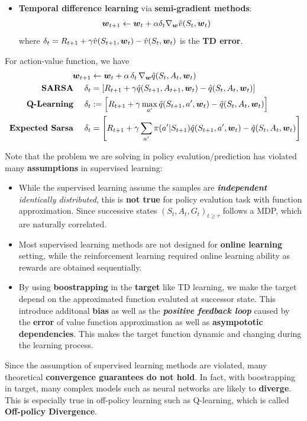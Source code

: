 \documentclass[11pt]{article}
\begin{document}
\begin{itemize}
\begin{itemize}
\item \textbf{Temporal difference learning} via \textbf{semi-gradient methods}:
\begin{align}
\boldsymbol{w}_{t+1} &\leftarrow  \boldsymbol{w}_{t} + \alpha \delta_{t}\nabla_{\boldsymbol{w}}{\hat{v}(S_{t}, \boldsymbol{w}_{t})} \label{eqn: td_fun_approx}
\end{align} where $\delta_{t} = R_{t+1} + \gamma \hat{v}(S_{t+1}, \boldsymbol{w}_{t}) - \hat{v}(S_{t}, \boldsymbol{w}_{t})$ is the \textbf{TD error}.
\end{itemize} For action-value function, we have
\begin{align}
\boldsymbol{w}_{t+1} &\leftarrow  \boldsymbol{w}_{t} + \alpha\, \delta_{t}\,\nabla_{\boldsymbol{w}}{\hat{q}(S_{t}, A_{t}, \boldsymbol{w}_{t})}  \nonumber\\
\text{  \textbf{SARSA} }\quad \delta_{t} &= \left[R_{t+1} + \gamma \hat{q}(S_{t+1}, A_{t+1}, \boldsymbol{w}_{t}) - \hat{q}(S_{t}, A_{t}, \boldsymbol{w}_{t})\right] \label{eqm: semi_grad_sarsa}\\
\text{  \textbf{Q-Learning} }\quad \delta_{t}&:=\left[R_{t+1} + \gamma \max_{a'}\hat{q}(S_{t+1}, a', \boldsymbol{w}_{t}) - \hat{q}(S_{t}, A_{t}, \boldsymbol{w}_{t})\right]   \label{eqn: semi_grad_q_learning}\\
 \text{  \textbf{Expected Sarsa} }\quad \delta_{t} &= \left[R_{t+1} +\gamma\sum_{a'}\pi(a'|S_{t+1})\hat{q}(S_{t+1}, a', \boldsymbol{w}_{t}) - \hat{q}(S_{t}, A_{t}, \boldsymbol{w}_{t})\right]  \label{eqn: semi_grad_exp_sarsa} 
\end{align} 

Note that the problem we are solving in policy evalution/prediction has violated many \textbf{assumptions} in supervised learning:
\begin{itemize}
\item While the supervised learning assume the samples are \textbf{\emph{independent}} \emph{identically distributed}, this is \textbf{not true} for policy evalution task with function approximation. Since successive states $(S_{t}, A_{t}, G_{t})_{t \ge \tau}$ follows a MDP, which are naturally correlated. 

\item Most supervised learning methods are not designed for \textbf{online learning} setting, while the reinforcement learning required online learning ability as rewards are obtained sequentially. 

\item By using \textbf{boostrapping} in the \textbf{target} like TD learning, we make the target depend on the approximated function evaluted at successor state. This introduce additonal \textbf{bias} as well as the \emph{\textbf{positive feedback loop}} caused by the \textbf{error} of value function approximation as well as \textbf{asympototic dependencies}.  This makes the target function dynamic and changing during the learning process. 
\end{itemize}
Since the assumption of supervised learning methods are violated, many theoretical \textbf{convergence guarantees do not hold}. In fact, with boostrapping in target, many complex models such as neural networks are likely to \textbf{diverge}. This is especially true in off-policy learning such as Q-learning, which is called \textbf{Off-policy Divergence}.


\end{itemize}
\end{document}
